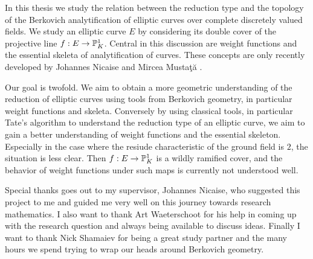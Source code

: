 In this thesis we study the relation between the reduction type and the topology of the Berkovich analytification of elliptic curves over complete discretely valued fields. 
We study an elliptic curve $E$ by considering its double cover of the projective line $f:E \to \mathbb{P}^{1}_K$.
Central in this discussion are weight functions and the essential skeleta of analytification of curves. 
These concepts are only recently developed by Johannes Nicaise and Mircea Mustaţă \cite{mustataWeightFunctionsNonArchimedean2015}.

Our goal is twofold. We aim to obtain a more geometric understanding of the reduction of elliptic curves using tools from Berkovich geometry, in particular weight functions and skeleta. 
Conversely by using classical tools, in particular Tate's algorithm to understand the reduction type of an elliptic curve, we aim to gain a better understanding of weight functions and the essential skeleton. 
Especially in the case where the resiude characteristic of the ground field is $2$, the situation is less clear.
Then $f: E \to \mathbb{P}^{1}_K$ is a wildly ramified cover, and the behavior of weight functions under such maps is currently not understood well.  

\medskip

Special thanks goes out to my supervisor, Johannes Nicaise, who suggested this project to me and guided me very well on this journey towards research mathematics. 
I also want to thank Art Waeterschoot for his help in coming up with the research question and always being available to discuss ideas. 
Finally I want to thank Nick Shamaiev for being a great study partner and the many hours we spend trying to wrap our heads around Berkovich geometry. 


